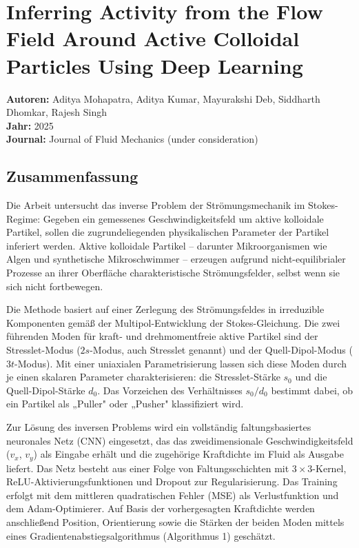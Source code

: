 \documentclass[a4paper,12pt]{article}
\begin{document}
\section*{Inferring Activity from the Flow Field Around Active Colloidal Particles Using Deep Learning}
\textbf{Autoren:} Aditya Mohapatra, Aditya Kumar, Mayurakshi Deb, Siddharth Dhomkar, Rajesh Singh \\
\textbf{Jahr:} 2025 \\
\textbf{Journal:} Journal of Fluid Mechanics (under consideration)

\subsection*{Zusammenfassung}

Die Arbeit untersucht das inverse Problem der Strömungsmechanik im Stokes-Regime: Gegeben ein gemessenes Geschwindigkeitsfeld um aktive kolloidale Partikel, sollen die zugrundeliegenden physikalischen Parameter der Partikel inferiert werden. Aktive kolloidale Partikel – darunter Mikroorganismen wie Algen und synthetische Mikroschwimmer – erzeugen aufgrund nicht-equilibrialer Prozesse an ihrer Oberfläche charakteristische Strömungsfelder, selbst wenn sie sich nicht fortbewegen.

Die Methode basiert auf einer Zerlegung des Strömungsfeldes in irreduzible Komponenten gemäß der Multipol-Entwicklung der Stokes-Gleichung. Die zwei führenden Moden für kraft- und drehmomentfreie aktive Partikel sind der Stresslet-Modus ($2s$-Modus, auch Stresslet genannt) und der Quell-Dipol-Modus ($3t$-Modus). Mit einer uniaxialen Parametrisierung lassen sich diese Moden durch je einen skalaren Parameter charakterisieren: die Stresslet-Stärke $s_0$ und die Quell-Dipol-Stärke $d_0$. Das Vorzeichen des Verhältnisses $s_0/d_0$ bestimmt dabei, ob ein Partikel als „Puller" oder „Pusher" klassifiziert wird.

Zur Lösung des inversen Problems wird ein vollständig faltungsbasiertes neuronales Netz (CNN) eingesetzt, das das zweidimensionale Geschwindigkeitsfeld ($v_x$, $v_y$) als Eingabe erhält und die zugehörige Kraftdichte im Fluid als Ausgabe liefert. Das Netz besteht aus einer Folge von Faltungsschichten mit $3 \times 3$-Kernel, ReLU-Aktivierungsfunktionen und Dropout zur Regularisierung. Das Training erfolgt mit dem mittleren quadratischen Fehler (MSE) als Verlustfunktion und dem Adam-Optimierer. Auf Basis der vorhergesagten Kraftdichte werden anschließend Position, Orientierung sowie die Stärken der beiden Moden mittels eines Gradientenabstiegsalgorithmus (Algorithmus 1) geschätzt.
\end{document}

